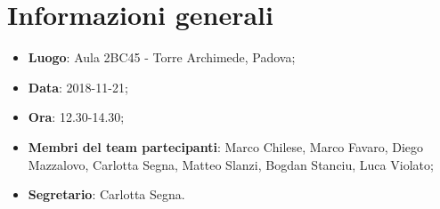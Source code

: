 \section{Informazioni generali}
\begin{itemize}
	\item \textbf{Luogo}: Aula 2BC45 - Torre Archimede, Padova; 
	\item \textbf{Data}: 2018-11-21;
	\item \textbf{Ora}:	12.30-14.30;
	\item \textbf{Membri del team partecipanti}: Marco Chilese, Marco Favaro, Diego Mazzalovo, Carlotta Segna, Matteo Slanzi, Bogdan Stanciu, Luca Violato;
	\item \textbf{Segretario}: Carlotta Segna. 
\end{itemize}